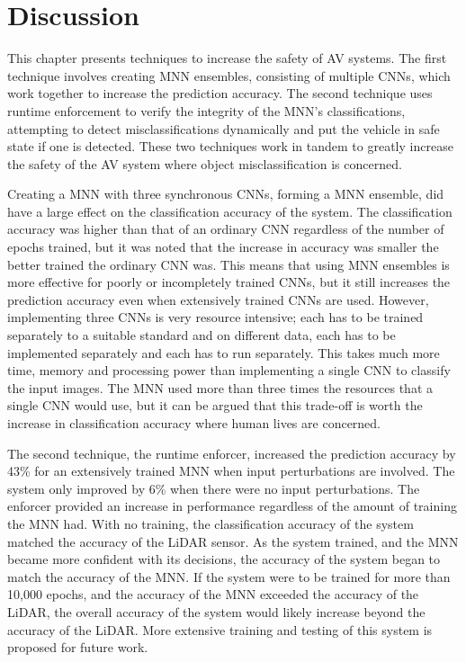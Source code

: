 \section{Discussion}
This chapter presents techniques to increase the safety of \ac{AV} systems. 
The first technique involves creating \ac{MNN} ensembles, consisting of multiple \acp{CNN}, which work together to increase the prediction accuracy.
The second technique uses runtime enforcement to verify the integrity of the \ac{MNN}'s classifications, attempting to detect misclassifications dynamically and put the vehicle in safe state if one is detected.
These two techniques work in tandem to greatly increase the safety of the \ac{AV} system where object misclassification is concerned.

Creating a \ac{MNN}  with three synchronous \acp{CNN}, forming a \ac{MNN} ensemble, did have a large effect on the classification accuracy of the system.
The classification accuracy was higher than that of an ordinary \ac{CNN} regardless of the number of epochs trained, but it was noted that the increase in accuracy was smaller the better trained the ordinary \ac{CNN} was.
This means that using \ac{MNN} ensembles is more effective for poorly or incompletely trained \acp{CNN}, but it still increases the prediction accuracy even when extensively trained \acp{CNN} are used.
However, implementing three \acp{CNN} is very resource intensive; each has to be trained separately to a suitable standard and on different data, each has to be implemented separately and each has to run separately.
This takes much more time, memory and processing power than implementing a single \ac{CNN} to classify the input images.
The \ac{MNN} used more than three times the resources that a single \ac{CNN} would use, but it can be argued that this trade-off is worth the increase in classification accuracy where human lives are concerned.

The second technique, the runtime enforcer, increased the prediction accuracy by 43\% for an extensively trained \ac{MNN} when input perturbations are involved.
The system only improved by 6\% when there were no input perturbations.
The enforcer provided an increase in performance regardless of the amount of training the \ac{MNN} had.
With no training, the classification accuracy of the system matched the accuracy of the \ac{LiDAR} sensor.
As the system trained, and the \ac{MNN} became more confident with its decisions, the accuracy of the system began to match the accuracy of the \ac{MNN}.
If the system were to be trained for more than 10,000 epochs, and the accuracy of the \ac{MNN} exceeded the accuracy of the \ac{LiDAR}, the overall accuracy of the system would likely increase beyond the accuracy of the \ac{LiDAR}.
More extensive training and testing of this system is proposed for future work.

